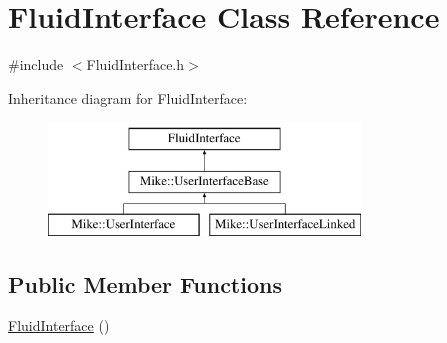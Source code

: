 \hypertarget{class_fluid_interface}{}\section{Fluid\+Interface Class Reference}
\label{class_fluid_interface}


{\ttfamily \#include $<$Fluid\+Interface.\+h$>$}

Inheritance diagram for Fluid\+Interface\+:\begin{figure}[H]
\begin{center}
\leavevmode
\includegraphics[height=3.000000cm]{class_fluid_interface}
\end{center}
\end{figure}
\subsection*{Public Member Functions}
\begin{DoxyCompactItemize}
\item 
\hyperlink{class_fluid_interface_a8d908e649929ac29ee7c7ea1d58972be}{Fluid\+Interface} ()
\end{DoxyCompactItemize}
